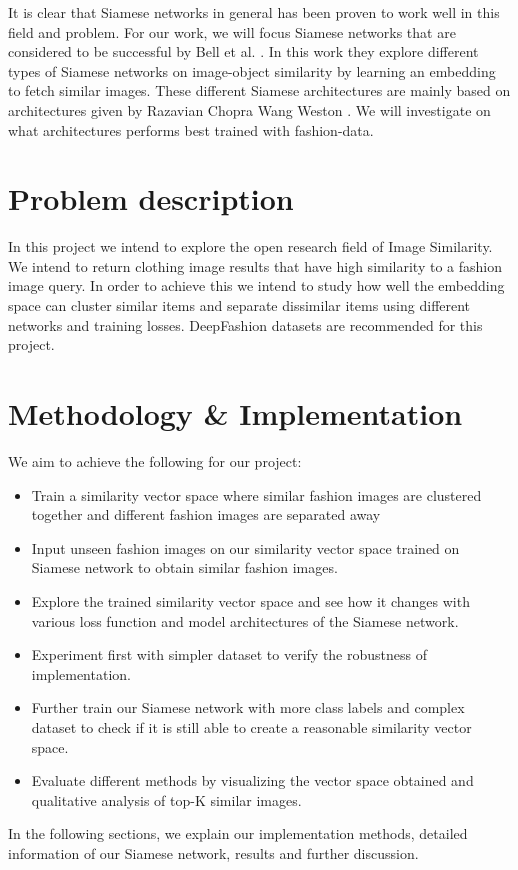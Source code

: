 \documentclass{article}
\begin{document}
It is clear that Siamese networks in general has been proven to work well in this field and problem. For our work, we will focus Siamese networks that are considered to be successful by Bell et al. \cite{bell2015learning}. In this work they explore different types of Siamese networks on image-object similarity by learning an embedding to fetch similar images. These different Siamese architectures are mainly based on architectures given by Razavian \cite{sharif2014cnn} Chopra \cite{chopra2005learning} Wang \cite{wang2014learning} Weston \cite{weston2012deep}. We will investigate on what architectures performs best trained with fashion-data.

\section{Problem description}
In this project we intend to explore the open research field of Image Similarity. We intend to return clothing image results that have high similarity to a fashion image query. In order to achieve this we intend to study how well the embedding space can cluster similar items and separate dissimilar items using different networks and training losses. DeepFashion datasets are recommended for this project.

\section{ Methodology \& Implementation}\label{methods}

We aim to achieve the following for our project:

\begin{itemize}
    \item Train a similarity vector space where similar fashion images are clustered together and different fashion images are separated away
    \item Input unseen fashion images on our similarity vector space trained on Siamese network to obtain similar fashion images.
    \item Explore the trained similarity vector space and see how it changes with various loss function and model architectures of the Siamese network.
    \item Experiment first with simpler dataset to verify the robustness of implementation.
    \item Further train our Siamese network with more class labels and complex dataset to check if it is still able to create a reasonable similarity vector space.
    \item Evaluate different methods by visualizing the vector space obtained and qualitative analysis of top-K similar images.

\end{itemize}  In the following sections, we explain our implementation methods, detailed information of our Siamese network, results and further discussion.
\end{document}
